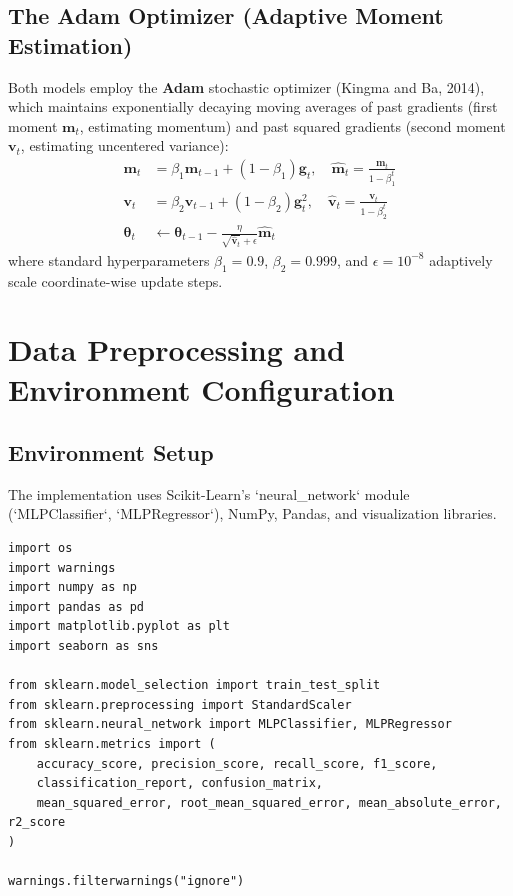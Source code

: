 \documentclass[12pt]{article}
\begin{document}
\subsection{The Adam Optimizer (Adaptive Moment Estimation)}
Both models employ the \textbf{Adam} stochastic optimizer (Kingma and Ba, 2014), which maintains exponentially decaying moving averages of past gradients (first moment $\mathbf{m}_t$, estimating momentum) and past squared gradients (second moment $\mathbf{v}_t$, estimating uncentered variance):
\begin{align}
    \mathbf{m}_t &= \beta_1 \mathbf{m}_{t-1} + (1 - \beta_1) \mathbf{g}_t, \quad \hat{\mathbf{m}}_t = \frac{\mathbf{m}_t}{1 - \beta_1^t} \\
    \mathbf{v}_t &= \beta_2 \mathbf{v}_{t-1} + (1 - \beta_2) \mathbf{g}_t^2, \quad \hat{\mathbf{v}}_t = \frac{\mathbf{v}_t}{1 - \beta_2^t} \\
    \boldsymbol{\theta}_t &\leftarrow \boldsymbol{\theta}_{t-1} - \frac{\eta}{\sqrt{\hat{\mathbf{v}}_t} + \epsilon} \hat{\mathbf{m}}_t
\end{align}
where standard hyperparameters $\beta_1 = 0.9$, $\beta_2 = 0.999$, and $\epsilon = 10^{-8}$ adaptively scale coordinate-wise update steps.

\newpage
\section{Data Preprocessing and Environment Configuration}

\subsection{Environment Setup}
The implementation uses Scikit-Learn's `neural_network` module (`MLPClassifier`, `MLPRegressor`), NumPy, Pandas, and visualization libraries.

\begin{lstlisting}[style=code]
import os
import warnings
import numpy as np
import pandas as pd
import matplotlib.pyplot as plt
import seaborn as sns

from sklearn.model_selection import train_test_split
from sklearn.preprocessing import StandardScaler
from sklearn.neural_network import MLPClassifier, MLPRegressor
from sklearn.metrics import (
    accuracy_score, precision_score, recall_score, f1_score,
    classification_report, confusion_matrix,
    mean_squared_error, root_mean_squared_error, mean_absolute_error, r2_score
)

warnings.filterwarnings("ignore")
\end{lstlisting}
\end{document}
